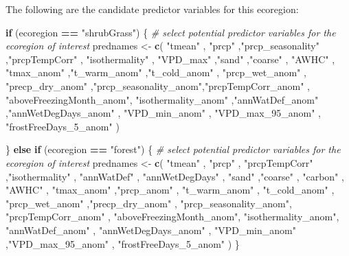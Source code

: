 \documentclass[
]{article}
\newenvironment{Shaded}{\begin{snugshade}}{\end{snugshade}}
\newcommand{\CommentTok}[1]{\textcolor[rgb]{0.56,0.35,0.01}{\textit{#1}}}
\newcommand{\ControlFlowTok}[1]{\textcolor[rgb]{0.13,0.29,0.53}{\textbf{#1}}}
\newcommand{\FunctionTok}[1]{\textcolor[rgb]{0.13,0.29,0.53}{\textbf{#1}}}
\newcommand{\NormalTok}[1]{#1}
\newcommand{\OtherTok}[1]{\textcolor[rgb]{0.56,0.35,0.01}{#1}}
\newcommand{\SpecialCharTok}[1]{\textcolor[rgb]{0.81,0.36,0.00}{\textbf{#1}}}
\newcommand{\StringTok}[1]{\textcolor[rgb]{0.31,0.60,0.02}{#1}}
\begin{document}
The following are the candidate predictor variables for this ecoregion:

\begin{Shaded}
\begin{Highlighting}[]
\ControlFlowTok{if}\NormalTok{ (ecoregion }\SpecialCharTok{==} \StringTok{"shrubGrass"}\NormalTok{) \{}
  \CommentTok{\# select potential predictor variables for the ecoregion of interest}
\NormalTok{        prednames }\OtherTok{\textless{}{-}}
          \FunctionTok{c}\NormalTok{(}
\StringTok{"tmean"}\NormalTok{                  , }\StringTok{"prcp"}\NormalTok{               ,}\StringTok{"prcp\_seasonality"}\NormalTok{     ,}\StringTok{"prcpTempCorr"}\NormalTok{        ,   }
\StringTok{"isothermality"}\NormalTok{          , }\StringTok{"VPD\_max"}\NormalTok{            ,}\StringTok{"sand"}\NormalTok{                 ,}\StringTok{"coarse"}\NormalTok{              ,   }
\StringTok{"AWHC"}\NormalTok{                   , }\StringTok{"tmax\_anom"}\NormalTok{          ,}\StringTok{"t\_warm\_anom"}\NormalTok{          ,}\StringTok{"t\_cold\_anom"}\NormalTok{         ,   }
\StringTok{"prcp\_wet\_anom"}\NormalTok{          , }\StringTok{"precp\_dry\_anom"}\NormalTok{     ,}\StringTok{"prcp\_seasonality\_anom"}\NormalTok{,}\StringTok{"prcpTempCorr\_anom"}\NormalTok{   ,   }
\StringTok{"aboveFreezingMonth\_anom"}\NormalTok{, }\StringTok{"isothermality\_anom"}\NormalTok{ ,}\StringTok{"annWatDef\_anom"}\NormalTok{       ,}\StringTok{"annWetDegDays\_anom"}\NormalTok{  ,   }
\StringTok{"VPD\_min\_anom"}\NormalTok{           , }\StringTok{"VPD\_max\_95\_anom"}\NormalTok{    ,   }
\StringTok{"frostFreeDays\_5\_anom"}\NormalTok{   )}
  
\NormalTok{\} }\ControlFlowTok{else} \ControlFlowTok{if}\NormalTok{ (ecoregion }\SpecialCharTok{==} \StringTok{"forest"}\NormalTok{) \{}
  \CommentTok{\# select potential predictor variables for the ecoregion of interest}
\NormalTok{  prednames }\OtherTok{\textless{}{-}} 
    \FunctionTok{c}\NormalTok{(}
\StringTok{"tmean"}\NormalTok{               , }\StringTok{"prcp"}\NormalTok{                , }\StringTok{"prcpTempCorr"}\NormalTok{            ,}\StringTok{"isothermality"}\NormalTok{      , }
\StringTok{"annWatDef"}\NormalTok{           , }\StringTok{"annWetDegDays"}\NormalTok{       , }\StringTok{"sand"}\NormalTok{                    ,}\StringTok{"coarse"}\NormalTok{             , }
\StringTok{"carbon"}\NormalTok{              , }\StringTok{"AWHC"}\NormalTok{                , }\StringTok{"tmax\_anom"}\NormalTok{               ,}\StringTok{"prcp\_anom"}\NormalTok{          , }
\StringTok{"t\_warm\_anom"}\NormalTok{         , }\StringTok{"t\_cold\_anom"}\NormalTok{         , }\StringTok{"prcp\_wet\_anom"}\NormalTok{           ,}\StringTok{"precp\_dry\_anom"}\NormalTok{     , }
\StringTok{"prcp\_seasonality\_anom"}\NormalTok{, }\StringTok{"prcpTempCorr\_anom"}\NormalTok{  ,  }\StringTok{"aboveFreezingMonth\_anom"}\NormalTok{, }\StringTok{"isothermality\_anom"}\NormalTok{,  }
\StringTok{"annWatDef\_anom"}\NormalTok{      , }\StringTok{"annWetDegDays\_anom"}\NormalTok{  , }\StringTok{"VPD\_min\_anom"}\NormalTok{            ,}\StringTok{"VPD\_max\_95\_anom"}\NormalTok{    , }
 \StringTok{"frostFreeDays\_5\_anom"}   
\NormalTok{    )}
\NormalTok{\}}


\end{Highlighting}
\end{Shaded}
\end{document}

